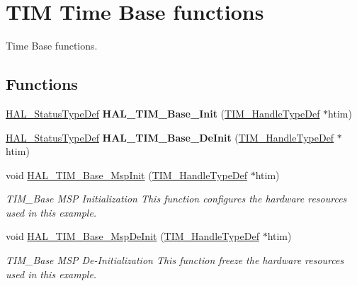 \hypertarget{group___t_i_m___exported___functions___group1}{}\section{T\+IM Time Base functions}
\label{group___t_i_m___exported___functions___group1}


Time Base functions.  


\subsection*{Functions}
\begin{DoxyCompactItemize}
\item 
\mbox{\label{group___t_i_m___exported___functions___group1_ga1b288eb68eb52c97b8d187cdd6e9088f}} 
\hyperlink{stm32f4xx__hal__def_8h_a63c0679d1cb8b8c684fbb0632743478f}{H\+A\+L\+\_\+\+Status\+Type\+Def} {\bfseries H\+A\+L\+\_\+\+T\+I\+M\+\_\+\+Base\+\_\+\+Init} (\hyperlink{struct_t_i_m___handle_type_def}{T\+I\+M\+\_\+\+Handle\+Type\+Def} $\ast$htim)
\item 
\mbox{\label{group___t_i_m___exported___functions___group1_gaaf97adbc39e48456a1c83c54895de83b}} 
\hyperlink{stm32f4xx__hal__def_8h_a63c0679d1cb8b8c684fbb0632743478f}{H\+A\+L\+\_\+\+Status\+Type\+Def} {\bfseries H\+A\+L\+\_\+\+T\+I\+M\+\_\+\+Base\+\_\+\+De\+Init} (\hyperlink{struct_t_i_m___handle_type_def}{T\+I\+M\+\_\+\+Handle\+Type\+Def} $\ast$htim)
\item 
void \hyperlink{group___t_i_m___exported___functions___group1_ga818f4d5d1e2f417438d281b4ac9efb9c}{H\+A\+L\+\_\+\+T\+I\+M\+\_\+\+Base\+\_\+\+Msp\+Init} (\hyperlink{struct_t_i_m___handle_type_def}{T\+I\+M\+\_\+\+Handle\+Type\+Def} $\ast$htim)
\begin{DoxyCompactList}\small\item\em T\+I\+M\+\_\+\+Base M\+SP Initialization This function configures the hardware resources used in this example. \end{DoxyCompactList}\item 
void \hyperlink{group___t_i_m___exported___functions___group1_ga13352a6c9cb3225511e5f29dbb894e84}{H\+A\+L\+\_\+\+T\+I\+M\+\_\+\+Base\+\_\+\+Msp\+De\+Init} (\hyperlink{struct_t_i_m___handle_type_def}{T\+I\+M\+\_\+\+Handle\+Type\+Def} $\ast$htim)
\begin{DoxyCompactList}\small\item\em T\+I\+M\+\_\+\+Base M\+SP De-\/\+Initialization This function freeze the hardware resources used in this example. \end{DoxyCompactList}\item 

\end{DoxyCompactItemize}
